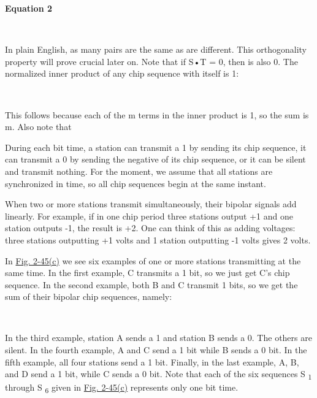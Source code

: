 \documentclass[b5paper,11pt]{memoir}
\begin{document}
\textbf{\protect\hypertarget{0130661023_ch02lev1sec6.htmlux5cux23ch02eq04}{}{}
Equation 2}


~

In plain English, as many pairs are the same as are different. This
orthogonality property will prove crucial later on. Note that if {S}•{T}
= 0, then
is also 0. The normalized inner
product of any chip sequence with itself is 1:


~

This follows because each of the {m} terms in the inner product is 1, so
the sum is {m}. Also note that

During each bit time, a station can transmit a 1 by sending its chip
sequence, it can transmit a 0 by sending the negative of its chip
sequence, or it can be silent and transmit nothing. For the moment, we
assume that all stations are synchronized in time, so all chip sequences
begin at the same instant.

When two or more stations transmit simultaneously, their bipolar signals
add linearly. For example, if in one chip period three stations output
+1 and one station outputs -1, the result is +2. One can think of this
as adding voltages: three stations outputting +1 volts and 1 station
outputting -1 volts gives 2 volts.

In
\protect\hyperlink{0130661023_ch02lev1sec6.htmlux5cux23ch02fig45}{Fig.
2-45(c)} we see six examples of one or more stations transmitting at the
same time. In the first example, {C} transmits a 1 bit, so we just get
{C}'s chip sequence. In the second example, both {B} and {C} transmit 1
bits, so we get the sum of their bipolar chip sequences, namely:


~

In the third example, station {A} sends a 1 and station {B} sends a 0.
The others are silent. In the fourth example, {A} and {C} send a 1 bit
while {B} sends a 0 bit. In the fifth example, all four stations send a
1 bit. Finally, in the last example, {A}, {B}, and {D} send a 1 bit,
while {C} sends a 0 bit. Note that each of the six sequences {S}
\textsubscript{1} through {S} \textsubscript{6} given in
\protect\hyperlink{0130661023_ch02lev1sec6.htmlux5cux23ch02fig45}{Fig.
2-45(c)} represents only one bit time.
\end{document}
